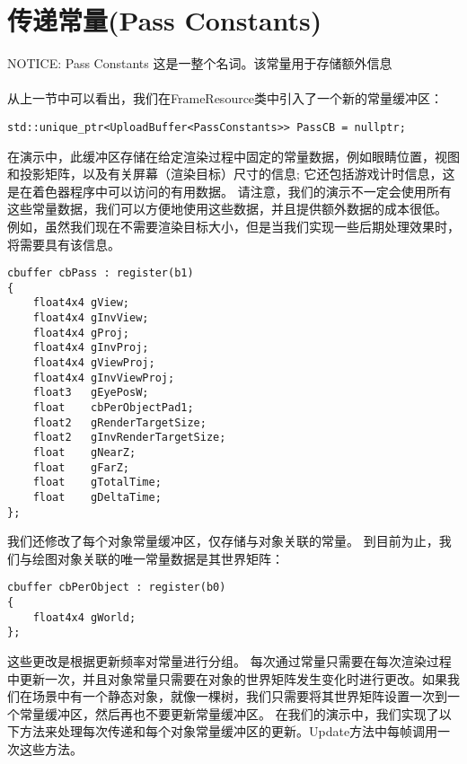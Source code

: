 \section{传递常量(Pass Constants)}
\begin{flushleft}
NOTICE: Pass Constants 这是一整个名词。该常量用于存储额外信息\\
~\\
从上一节中可以看出，我们在FrameResource类中引入了一个新的常量缓冲区：
\end{flushleft}
\begin{lstlisting}
std::unique_ptr<UploadBuffer<PassConstants>> PassCB = nullptr;
\end{lstlisting}
\begin{flushleft}
在演示中，此缓冲区存储在给定渲染过程中固定的常量数据，例如眼睛位置，视图和投影矩阵，以及有关屏幕（渲染目标）尺寸的信息; 它还包括游戏计时信息，这是在着色器程序中可以访问的有用数据。 请注意，我们的演示不一定会使用所有这些常量数据，我们可以方便地使用这些数据，并且提供额外数据的成本很低。 例如，虽然我们现在不需要渲染目标大小，但是当我们实现一些后期处理效果时，将需要具有该信息。
\end{flushleft}
\begin{lstlisting}
cbuffer cbPass : register(b1)
{
    float4x4 gView;
    float4x4 gInvView;
    float4x4 gProj;
    float4x4 gInvProj;
    float4x4 gViewProj;
    float4x4 gInvViewProj;
    float3   gEyePosW;
    float    cbPerObjectPad1;
    float2   gRenderTargetSize;
    float2   gInvRenderTargetSize;
    float    gNearZ;
    float    gFarZ;
    float    gTotalTime;
    float    gDeltaTime;
};
\end{lstlisting}
\begin{flushleft}
我们还修改了每个对象常量缓冲区，仅存储与对象关联的常量。 到目前为止，我们与绘图对象关联的唯一常量数据是其世界矩阵：
\end{flushleft}
\begin{lstlisting}
cbuffer cbPerObject : register(b0)
{
    float4x4 gWorld;
};
\end{lstlisting}
\begin{flushleft}
这些更改是根据更新频率对常量进行分组。 每次通过常量只需要在每次渲染过程中更新一次，并且对象常量只需要在对象的世界矩阵发生变化时进行更改。如果我们在场景中有一个静态对象，就像一棵树，我们只需要将其世界矩阵设置一次到一个常量缓冲区，然后再也不要更新常量缓冲区。 在我们的演示中，我们实现了以下方法来处理每次传递和每个对象常量缓冲区的更新。Update方法中每帧调用一次这些方法。
\end{flushleft}
